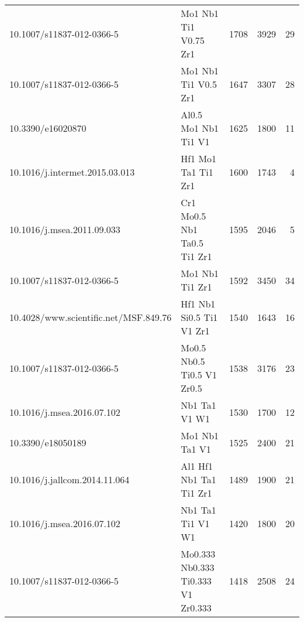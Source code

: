 \begin{tabular}{llrrr}
             10.1007/s11837-012-0366-5 &                        Mo1 Nb1 Ti1 V0.75 Zr1 &                1708 &                 3929 &                        29 \\
             10.1007/s11837-012-0366-5 &                         Mo1 Nb1 Ti1 V0.5 Zr1 &                1647 &                 3307 &                        28 \\
                     10.3390/e16020870 &                         Al0.5 Mo1 Nb1 Ti1 V1 &                1625 &                 1800 &                        11 \\
        10.1016/j.intermet.2015.03.013 &                          Hf1 Mo1 Ta1 Ti1 Zr1 &                1600 &                 1743 &                         4 \\
            10.1016/j.msea.2011.09.033 &                  Cr1 Mo0.5 Nb1 Ta0.5 Ti1 Zr1 &                1595 &                 2046 &                         5 \\
             10.1007/s11837-012-0366-5 &                              Mo1 Nb1 Ti1 Zr1 &                1592 &                 3450 &                        34 \\
 10.4028/www.scientific.net/MSF.849.76 &                     Hf1 Nb1 Si0.5 Ti1 V1 Zr1 &                1540 &                 1643 &                        16 \\
             10.1007/s11837-012-0366-5 &                   Mo0.5 Nb0.5 Ti0.5 V1 Zr0.5 &                1538 &                 3176 &                        23 \\
            10.1016/j.msea.2016.07.102 &                                Nb1 Ta1 V1 W1 &                1530 &                 1700 &                        12 \\
                     10.3390/e18050189 &                               Mo1 Nb1 Ta1 V1 &                1525 &                 2400 &                        21 \\
         10.1016/j.jallcom.2014.11.064 &                      Al1 Hf1 Nb1 Ta1 Ti1 Zr1 &                1489 &                 1900 &                        21 \\
            10.1016/j.msea.2016.07.102 &                            Nb1 Ta1 Ti1 V1 W1 &                1420 &                 1800 &                        20 \\
             10.1007/s11837-012-0366-5 &           Mo0.333 Nb0.333 Ti0.333 V1 Zr0.333 &                1418 &                 2508 &                        24 \\
\bottomrule
\end{tabular}
